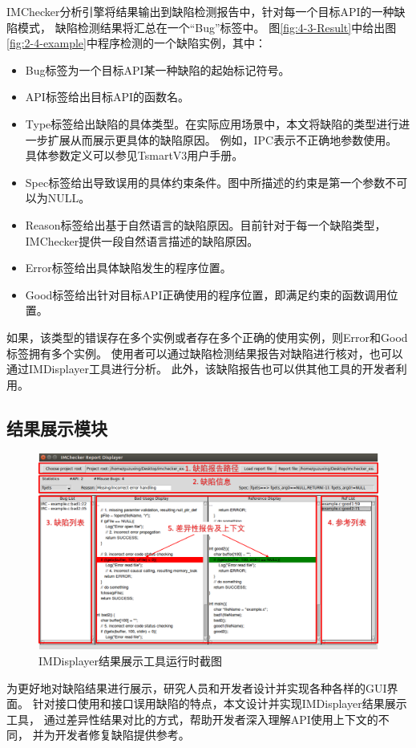 IMChecker分析引擎将结果输出到缺陷检测报告中，针对每一个目标API的一种缺陷模式，
缺陷检测结果将汇总在一个“Bug”标签中。
图\ref{fig:4-3-Result}中给出图\ref{fig:2-4-example}中程序检测的一个缺陷实例，其中：
\begin{itemize}
	\item Bug标签为一个目标API某一种缺陷的起始标记符号。
	\item API标签给出目标API的函数名。
	\item Type标签给出缺陷的具体类型。在实际应用场景中，本文将缺陷的类型进行进一步扩展从而展示更具体的缺陷原因。
	例如，IPC表示不正确地参数使用。
	具体参数定义可以参见TsmartV3用户手册。
	\item Spec标签给出导致误用的具体约束条件。图中所描述的约束是第一个参数不可以为NULL。
	\item Reason标签给出基于自然语言的缺陷原因。目前针对于每一个缺陷类型，IMChecker提供一段自然语言描述的缺陷原因。
	\item Error标签给出具体缺陷发生的程序位置。
	\item Good标签给出针对目标API正确使用的程序位置，即满足约束的函数调用位置。
\end{itemize}
如果，该类型的错误存在多个实例或者存在多个正确的使用实例，则Error和Good标签拥有多个实例。
使用者可以通过缺陷检测结果报告对缺陷进行核对，也可以通过IMDisplayer工具进行分析。
此外，该缺陷报告也可以供其他工具的开发者利用。


\subsection{结果展示模块}
\begin{figure}[b]
	\centering
	\includegraphics[width=0.85\linewidth]{figures/cp4-IMDisplayer.png}
	\caption{
		IMDisplayer结果展示工具运行时截图
	}
	\label{fig:4-3-IMDisplayer}
\end{figure}

为更好地对缺陷结果进行展示，研究人员和开发者设计并实现各种各样的GUI界面。
针对接口使用和接口误用缺陷的特点，本文设计并实现IMDisplayer结果展示工具，
通过差异性结果对比的方式，帮助开发者深入理解API使用上下文的不同，
并为开发者修复缺陷提供参考。

